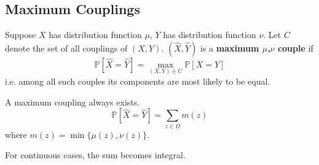     \subsection{Maximum Couplings}
        \begin{definition}
            Suppose $X$ has distribution function $\mu$, $Y$ has distribution function $\nu$. Let $C$ denote the set of all couplings of $(X,Y)$. $(\hat{X},\hat{Y})$ is a \textbf{maximum $\mu$,$\nu$ couple} if
            \[ \mathbb{P}[\hat{X}=\hat{Y}] = \max_{(X,Y)\in C}\mathbb{P}[X=Y] \]
            i.e. among all such couples its components are most likely to be equal.
        \end{definition}
        \begin{proposition}
            A maximum coupling always exists.
            \[ \mathbb{P}[\hat{X} = \hat{Y}] = \sum_{z\in\Omega}m(z) \]
            where $m(z) = \min\{ \mu(z), \nu(z) \}$.
        \end{proposition}
        \begin{remark}
            For continuous cases, the sum becomes integral.
        \end{remark}

